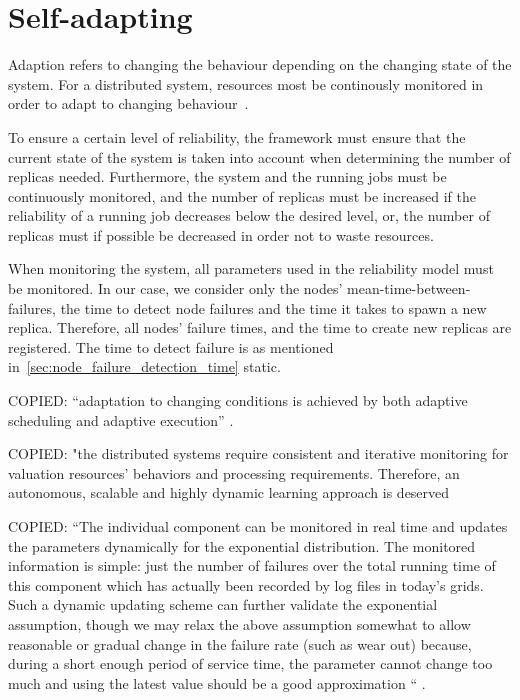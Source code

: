 \documentclass{cslthse-msc}
\begin{document}
\section{Self-adapting} \label{sec:design_self_adapting}
Adaption refers to changing the behaviour depending on the changing state of the system. For a distributed system, resources most be continously monitored in order to adapt to changing behaviour~\cite{imprRelAdaptRL}.

To ensure a certain level of reliability, the framework must ensure that the current state of the system is taken into account when determining the number of replicas needed. Furthermore, the system and the running jobs must be continuously monitored, and the number of replicas must be increased if the reliability of a running job decreases below the desired level, or, the number of replicas must if possible be decreased in order not to waste resources.

When monitoring the system, all parameters used in the reliability model must be monitored. In our case, we consider only the nodes' mean-time-between-failures, the time to detect node failures and the time it takes to spawn a new replica. Therefore, all nodes' failure times, and the time to create new replicas are registered. The time to detect failure is as mentioned in~\cref{sec:node_failure_detection_time} static.

\iffalse
COPIED: “adaptation to changing conditions is achieved by both adaptive scheduling and adaptive execution” \cite{evalOfGridRel}.

COPIED:
"the distributed systems require consistent and iterative monitoring for valuation resources’ behaviors and processing requirements. Therefore, an autonomous, scalable and highly dynamic learning approach is deserved \cite{imprRelAdaptRL}


COPIED:
“The individual component can be monitored in real time and updates the parameters dynamically for the exponential distribution. The monitored information is simple: just the number of failures over the total running time of this component which has actually been recorded by log files in today’s grids. Such a dynamic updating scheme can further validate the exponential assumption, though we may relax the above assumption somewhat to allow reasonable or gradual change in the failure rate (such as wear out) because, during a short enough period of service time, the parameter cannot change too much and using the latest value should be a good approximation “ \cite{hierarchicalRelModeling}.
\end{document}
